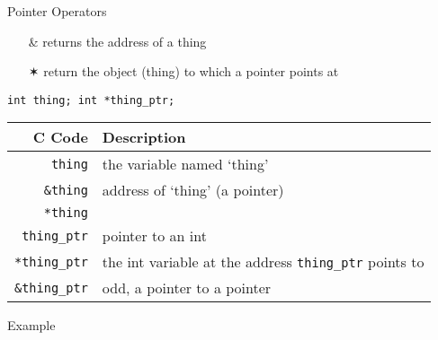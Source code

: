 \begin{frame}{Pointer Operators}
  \begin{itemize}
  \item[\&] returns the \alert{address} of a thing
  \item[{\dejavu ✶}] return the \alert{object (thing)} to which a pointer points at
  \end{itemize}
  \begin{block}{\texttt{int thing; int *thing\_ptr;}}
    \begin{center}
      \begin{tabular}{r|l}
        \textbf{C Code}&\textbf{Description}\\\hline
        \texttt{thing}& the variable named `thing'\\
        \texttt{\&thing}& address of `thing' (a pointer)\\
        \texttt{*thing}& \RedCross{}\\
        \texttt{thing\_ptr}& pointer to an int\\
        \texttt{*thing\_ptr}& the int variable at the address \texttt{thing\_ptr} points
                              to\\
        \texttt{\&thing\_ptr}& odd, a pointer to a pointer
      \end{tabular}
    \end{center}
  \end{block}
\end{frame}

\begin{frame}
  \begin{block}{Example}
    \begin{center}
    \end{center}
  \end{block}
  \begin{center}
  \end{center}
\end{frame}

